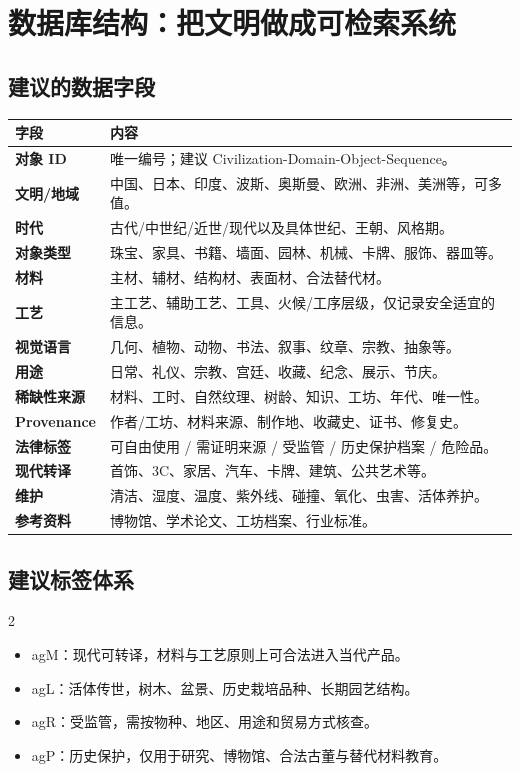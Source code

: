\documentclass[lang=en,a4paper,11pt]{elegantpaper}
\begin{document}
\section{数据库结构：把文明做成可检索系统}


\subsection{建议的数据字段}



\begin{longtable}{>{\bfseries}p{}p{}}
\toprule
字段 & 内容\\
\midrule
对象 ID & 唯一编号；建议 Civilization-Domain-Object-Sequence。\\
文明/地域 & 中国、日本、印度、波斯、奥斯曼、欧洲、非洲、美洲等，可多值。\\
时代 & 古代/中世纪/近世/现代以及具体世纪、王朝、风格期。\\
对象类型 & 珠宝、家具、书籍、墙面、园林、机械、卡牌、服饰、器皿等。\\
材料 & 主材、辅材、结构材、表面材、合法替代材。\\
工艺 & 主工艺、辅助工艺、工具、火候/工序层级，仅记录安全适宜的信息。\\
视觉语言 & 几何、植物、动物、书法、叙事、纹章、宗教、抽象等。\\
用途 & 日常、礼仪、宗教、宫廷、收藏、纪念、展示、节庆。\\
稀缺性来源 & 材料、工时、自然纹理、树龄、知识、工坊、年代、唯一性。\\
Provenance & 作者/工坊、材料来源、制作地、收藏史、证书、修复史。\\
法律标签 & 可自由使用 / 需证明来源 / 受监管 / 历史保护档案 / 危险品。\\
现代转译 & 首饰、3C、家居、汽车、卡牌、建筑、公共艺术等。\\
维护 & 清洁、湿度、温度、紫外线、碰撞、氧化、虫害、活体养护。\\
参考资料 & 博物馆、学术论文、工坊档案、行业标准。\\
\bottomrule
\end{longtable}

\subsection{建议标签体系}


\begin{multicols}{2}
\begin{itemize}
\item 	agM：现代可转译，材料与工艺原则上可合法进入当代产品。
\item 	agL：活体传世，树木、盆景、历史栽培品种、长期园艺结构。
\item 	agR：受监管，需按物种、地区、用途和贸易方式核查。
\item 	agP：历史保护，仅用于研究、博物馆、合法古董与替代材料教育。
\end{itemize}
\end{multicols}
\end{document}
